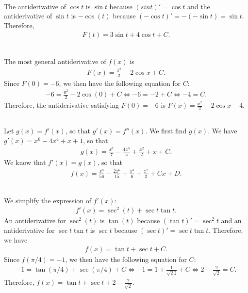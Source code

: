 	\spc
	
	\\
	The antiderivative of $\cos t$ is $\sin t$ because $(sin t)' = \cos t$ and the antiderivative of $\sin t$ is $-\cos (t)$ because $(-\cos t)' = - (-\sin t) = \sin t$. Therefore,
		\begin{align*}
		F(t) = 3 \sin t + 4 \cos t + C .
		\end{align*}
		
	\spc
	
	\\
	The most general antiderivative of $f(x)$ is
		\begin{align*}
		F(x) = \frac{x^2}{2} - 2 \cos x + C .
		\end{align*}
	Since $F(0) = -6$, we then have the following equation for $C$:
		\begin{align*}
		-6 = \frac{0^2}{2} - 2 \cos (0) + C \iff -6 = -2 + C \iff -4 = C .
		\end{align*}
	Therefore, the antiderivative satisfying $F(0) = -6$ is $F(x) = \tfrac{x^2}{2} - 2\cos x - 4$.
	
	\spc
	
	\\
	Let $g(x) = f'(x)$, so that $g'(x) = f''(x)$. We first find $g(x)$. We have $g'(x) = x^6 - 4x^4 + x + 1$, so that
		\begin{align*}
		g(x) = \frac{x^7}{7} - \frac{4x^5}{5} + \frac{x^2}{2} + x + C .
		\end{align*}
	We know that $f'(x) = g(x)$, so that
		\begin{align*}
		f(x) = \frac{x^8}{56} - \frac{2x^6}{15} + \frac{x^3}{6} + \frac{x^2}{2} + Cx + D .
		\end{align*}
		
	\spc
	
	\\
	We simplify the expression of $f'(x)$:
		\begin{align*}
		f'(x) = \sec^2 (t) + \sec t \tan t .
		\end{align*}
	An antiderivative for $\sec^2 (t)$ is $\tan (t)$ because $(\tan t)' = \sec^2 t$ and an antiderivative for $\sec t \tan t$ is $\sec t$ because $(\sec t)' = \sec t \tan t$. Therefore, we have
		\begin{align*}
		f(x) = \tan t + \sec t + C .
		\end{align*}
	Since $f(\pi / 4 ) = -1$, we then have the following equation for $C$:
		\begin{align*}
		-1 = \tan (\pi/4) + \sec (\pi/4) + C \iff -1 = 1 + \frac{1}{\sqrt{2}{2}} + C \iff 2 - \frac{2}{\sqrt{2}} = C .
		\end{align*}
	Therefore, $f(x) = \tan t + \sec t + 2 - \frac{2}{\sqrt{2}}$.
		
		
